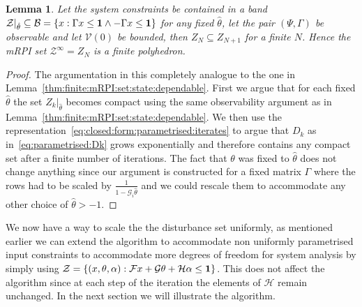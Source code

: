 \documentclass[letterpaper, 10pt, conference]{ieeeconf} %
\newtheorem{thm}{Lemma}[section]
\begin{document}
%
\begin{thm}
Let the system constraints be contained in a band $\mathcal Z\vert_{\hat\theta}\subseteq\mathcal 
B=\{x:\Gamma x\leq {\bf{1}}\wedge -\Gamma x\leq {\bf{1}}\}$ for any fixed $\hat\theta$, let the
pair $(\Psi,\Gamma)$ be observable and let $\mathcal V(0)$ be bounded, then $Z_N\subseteq Z_{N+1}$
for a finite $N$. Hence the mRPI set $\mathcal Z^\infty = Z_N$ is a finite polyhedron.
\end{thm}
%
\begin{proof}
The argumentation in this completely analogue to the one in Lemma~\ref{thm:finite:mRPI:set:state:dependable}.
First we argue that for each fixed $\hat\theta$ the set $Z_k\vert_{\hat\theta}$ becomes compact using the same
observability argument as in Lemma~\ref{thm:finite:mRPI:set:state:dependable}.
We then use the representation~\eqref{eq:closed:form:parametrised:iterates} to argue that $D_k$ as
in~\eqref{eq:parametrised:Dk} grows exponentially and therefore contains any compact set after a finite number
of iterations. The fact that $\theta$ was fixed to $\hat\theta$ does not change anything since
our argument is constructed for a fixed matrix $\Gamma$ where the rows had to be scaled by 
$\frac{1}{1-\mathcal G_i\hat\theta}$ and we could rescale them to accommodate any other choice of $\hat\theta>-1$.
\end{proof}
We now have a way to scale the the disturbance set uniformly, as mentioned earlier we can extend the algorithm
to accommodate non uniformly parametrised input constraints to accommodate more degrees of freedom for 
system analysis by simply using $\mathcal Z = \{(x,\theta,\alpha): \mathcal F x + \mathcal G\theta + 
\mathcal H \alpha \leq {\bf{1}}\}$. This does not affect the algorithm since at each step of the iteration 
the elements of $\mathcal H$ remain unchanged. In the next section we will illustrate the algorithm.
%
%
%
%
%
%
\end{document}
